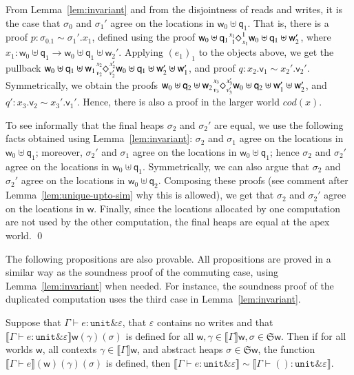 \documentclass[orivec]{llncs}
\newif\iffull\fullfalse
\newcommand{\keywd}[1]{\mathtt{#1}}
\newcommand{\sq}[4]{\tensor*[^{#1}_{#2}]{\Diamond}{^{#3}_{#4}}}
\newcommand{\unittype}{\keywd{unit}}
\newcommand{\unitval}{\keywd{()}}
\newcommand{\wrsin}[1]{\mathrm{wrs}({#1})}
\newcommand{\eff}{\varepsilon}
\newcommand{\sem}[1]{\ensuremath{\llbracket {#1} \rrbracket}}
\renewenvironment{proof}{\vspace{-1mm} \noindent {\bf Proof}\quad}{\qed}
\newcommand\w{\ensuremath{\mathsf{w}}\xspace}
\newcommand\q{\ensuremath{\mathsf{q}}\xspace}
\newcommand{\Astores}{\mathfrak{S}}
\newcommand\val{\ensuremath{\mathsf{v}}\xspace}
\newcommand{\ety}[2]{{#1}\mathrel{\&}{#2}}
\begin{document}
\begin{proof}
From Lemma~\ref{lem:invariant} and from 
the disjointness of reads and writes, it is the case that $\sigma_0$ and
$\sigma_1'$ agree on the locations in $\w_0 \uplus \q_1$.
That is, there is a proof $p : \sigma_0.1 \sim \sigma_1'.x_1$, defined 
using the proof $\w_0 \uplus \q_1 \sq{x_1}{1}{1}{x_1} \w_0
\uplus \q_1 \uplus \w_2'
$, where $x_1 : \w_0 \uplus \q_1 \to \w_0 \uplus \q_1 \uplus \w_2'$.
Applying $(e_1)_1$ to the objects above,
we get the pullback $\w_0 \uplus \q_1 \uplus \w_1 \sq{x_2}{v_2}{x_2'}{v_2'}
\w_0 \uplus \q_1
\uplus
\w_2' \uplus \w_1'$, and  proof $q : x_2.\val_1 \sim
x_2'.\val_2'$. Symmetrically, we obtain the proofs 
$\w_0 \uplus \q_2 \uplus \w_2 \sq{x_3}{v_3}{x_3'}{v_3'} \w_0 \uplus \q_2
\uplus \w_1' \uplus \w_2'$, and  $q' : x_3.\val_2 \sim
x_3'.\val_1'$. Hence, there is also a proof in the larger world $cod(x)$.

To see informally that the final heaps $\sigma_2$ and $\sigma_2'$ are
equal, we use
the following facts obtained using Lemma~\ref{lem:invariant}: $\sigma_2$
and $\sigma_1$ agree on the locations in $\w_0 \uplus \q_1$; moreover, 
$\sigma_2'$ and $\sigma_1$ agree on the locations in $\w_0 \uplus \q_1$; 
hence $\sigma_2$ and $\sigma_2'$ agree on the locations in $\w_0 \uplus
\q_1$. Symmetrically, we can also argue that $\sigma_2$ and $\sigma_2'$
agree on the locations in $\w_0 \uplus \q_2$. Composing these proofs 
(see comment after Lemma~\ref{lem:unique-upto-sim} why this is allowed), 
we get that $\sigma_2$ and $\sigma_2'$ agree on the locations in $\w$. 
Finally, since the locations allocated by one computation are not used by
the other computation, the final heaps are equal at the
apex world.
\end{proof}

The following propositions are also provable. All propositions are proved
in a similar way as the soundness proof of the commuting case, using 
Lemma~\ref{lem:invariant} when needed. For instance, the soundness proof
of the duplicated computation uses the third case in
Lemma~\ref{lem:invariant}.

\begin{proposition}Suppose that
$\Gamma \vdash e : \ety{\unittype}{\eff}$,
that \iffull $\wrsin{\eff}=\emptyset$ \else 
$\eff$ contains no writes \fi and that $\sem{\Gamma\vdash
e: \ety{\unittype}{\eff}}\w(\gamma)(\sigma)$ is defined for all
$\w,\gamma\in\sem{\Gamma}\w, \sigma\in\Astores\w$. 
Then if for all worlds \w, all contexts $\gamma \in
\sem{\Gamma}\w$, and abstract heaps $\sigma \in \Astores\w$,
the function $\sem{\Gamma \vdash e}(\w)(\gamma)(\sigma)$ is defined, 
then $\sem{\Gamma \vdash e : \ety{\unittype}{\eff}} \sim \sem{\Gamma
\vdash \unitval : \ety{\unittype}{\eff}}$.
\end{proposition}
\end{document}
